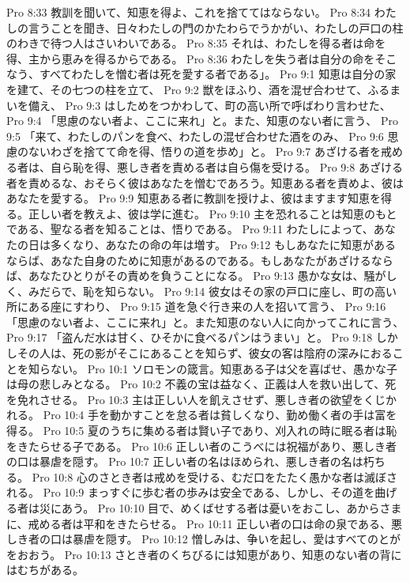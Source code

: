 Pro 8:33  教訓を聞いて、知恵を得よ、これを捨ててはならない。
Pro 8:34  わたしの言うことを聞き、日々わたしの門のかたわらでうかがい、わたしの戸口の柱のわきで待つ人はさいわいである。
Pro 8:35  それは、わたしを得る者は命を得、主から恵みを得るからである。
Pro 8:36  わたしを失う者は自分の命をそこなう、すべてわたしを憎む者は死を愛する者である」。
Pro 9:1  知恵は自分の家を建て、その七つの柱を立て、
Pro 9:2  獣をほふり、酒を混ぜ合わせて、ふるまいを備え、
Pro 9:3  はしためをつかわして、町の高い所で呼ばわり言わせた、
Pro 9:4  「思慮のない者よ、ここに来れ」と。また、知恵のない者に言う、
Pro 9:5  「来て、わたしのパンを食べ、わたしの混ぜ合わせた酒をのみ、
Pro 9:6  思慮のないわざを捨てて命を得、悟りの道を歩め」と。
Pro 9:7  あざける者を戒める者は、自ら恥を得、悪しき者を責める者は自ら傷を受ける。
Pro 9:8  あざける者を責めるな、おそらく彼はあなたを憎むであろう。知恵ある者を責めよ、彼はあなたを愛する。
Pro 9:9  知恵ある者に教訓を授けよ、彼はますます知恵を得る。正しい者を教えよ、彼は学に進む。
Pro 9:10  主を恐れることは知恵のもとである、聖なる者を知ることは、悟りである。
Pro 9:11  わたしによって、あなたの日は多くなり、あなたの命の年は増す。
Pro 9:12  もしあなたに知恵があるならば、あなた自身のために知恵があるのである。もしあなたがあざけるならば、あなたひとりがその責めを負うことになる。
Pro 9:13  愚かな女は、騒がしく、みだらで、恥を知らない。
Pro 9:14  彼女はその家の戸口に座し、町の高い所にある座にすわり、
Pro 9:15  道を急ぐ行き来の人を招いて言う、
Pro 9:16  「思慮のない者よ、ここに来れ」と。また知恵のない人に向かってこれに言う、
Pro 9:17  「盗んだ水は甘く、ひそかに食べるパンはうまい」と。
Pro 9:18  しかしその人は、死の影がそこにあることを知らず、彼女の客は陰府の深みにおることを知らない。
Pro 10:1  ソロモンの箴言。知恵ある子は父を喜ばせ、愚かな子は母の悲しみとなる。
Pro 10:2  不義の宝は益なく、正義は人を救い出して、死を免れさせる。
Pro 10:3  主は正しい人を飢えさせず、悪しき者の欲望をくじかれる。
Pro 10:4  手を動かすことを怠る者は貧しくなり、勤め働く者の手は富を得る。
Pro 10:5  夏のうちに集める者は賢い子であり、刈入れの時に眠る者は恥をきたらせる子である。
Pro 10:6  正しい者のこうべには祝福があり、悪しき者の口は暴虐を隠す。
Pro 10:7  正しい者の名はほめられ、悪しき者の名は朽ちる。
Pro 10:8  心のさとき者は戒めを受ける、むだ口をたたく愚かな者は滅ぼされる。
Pro 10:9  まっすぐに歩む者の歩みは安全である、しかし、その道を曲げる者は災にあう。
Pro 10:10  目で、めくばせする者は憂いをおこし、あからさまに、戒める者は平和をきたらせる。
Pro 10:11  正しい者の口は命の泉である、悪しき者の口は暴虐を隠す。
Pro 10:12  憎しみは、争いを起し、愛はすべてのとがをおおう。
Pro 10:13  さとき者のくちびるには知恵があり、知恵のない者の背にはむちがある。
